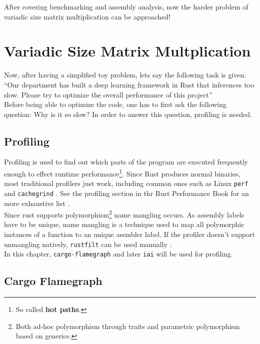 After covering benchmarking and assembly analysis, now the harder problem of variadic size matrix multiplication can be approached!

\section{Variadic Size Matrix Multplication}

Now, after having a simplified toy problem, lets say the following task is given:\\

``Our department has built a deep learning framework in Rust that inferences too slow. Please try to optimize the overall performance of this project''\\

Before being able to optimize the code, one has to first ask the following question: Why is it so slow? In order to answer this question, profiling is needed.

\subsection{Profiling}

Profiling is used to find out which parts of the program are executed frequently enough to effect runtime performance\footnote{So called \textbf{hot paths}.}. Since Rust produces normal binaries, most traditional profilers just work, including common ones such as Linux \texttt{perf} \cite{perf} and \texttt{cachegrind} \cite{cachegrind}. See the profiling section in thr Rust Performance Book for an more exhaustive list \cite{profiling}.\\

Since rust supports polymorphism\footnote{Both ad-hoc polymorphism through traits and parametric polymorphism based on generics.} name mangling occurs. As assembly labels have to be unique, name mangling is a technique used to map all polymorphic instances of a function to an unique assmbler label. If the profiler doesn't support unmangling natively, \texttt{rustfilt} can be used manually \cite{rustfilt}.\\

In this chapter, \texttt{cargo-flamegraph} \cite{flamegraph} and later \texttt{iai} \cite{iai} will be used for profiling.

\subsection{Cargo Flamegraph}

